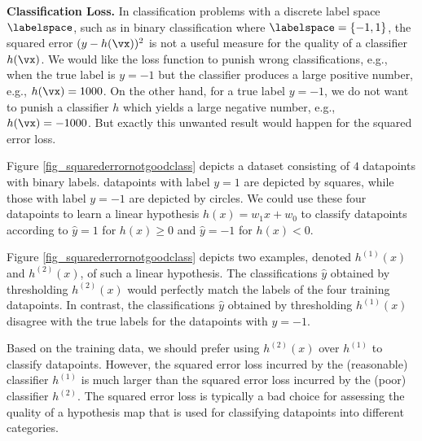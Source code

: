 \documentclass[12pt]{report}
\begin{document}
{\bf Classification Loss.} In classification problems with a 
discrete label space $\labelspace$, such as in binary classification 
where $\labelspace = \{-1,1\}$, the squared error $(y - h(\vx))^2$ 
is not a useful measure for the quality of a classifier $h(\vx)$. 
We would like the loss function to punish wrong classifications, 
e.g., when the true label is $y=-1$ but the classifier produces a 
large positive number, e.g., $h(\vx) = 1000$. On the other hand, 
for a true label $y=-1$, we do not want to punish a classifier $h$ 
which yields a large negative number, e.g., $h(\vx) = -1000$. But 
exactly this unwanted result would happen for the squared error 
loss. 

Figure \ref{fig_squarederrornotgoodclass} depicts a dataset 
consisting of $4$ datapoints with binary labels. datapoints 
with label $y=1$ are depicted by squares, while those with label 
$y=-1$ are depicted by circles. We could use these four datapoints 
to learn a linear hypothesis $h(x) = w_{1} x + w_{0}$ to classify 
datapoints according to $\hat{y} = 1$ for $h(x) \geq 0$ and 
$\hat{y}=-1$ for $h(x) < 0$. 

Figure \ref{fig_squarederrornotgoodclass} depicts two examples, 
denoted $h^{(1)}(x)$ and $h^{(2)}(x)$, of such a linear hypothesis. 
The classifications $\hat{y}$ obtained by thresholding $h^{(2)}(x)$ would 
perfectly match the labels of the four training datapoints. In 
contrast, the classifications $\hat{y}$ obtained by thresholding 
$h^{(1)}(x)$ disagree with the true labels for the datapoints 
with $y=-1$. 

Based on the training data, we should prefer using $h^{(2)}(x)$ 
over $h^{(1)}$ to classify datapoints. However, the squared error 
loss incurred by the (reasonable) classifier $h^{(1)}$ is much larger 
than the squared error loss incurred by the (poor) classifier $h^{(2)}$. 
The squared error loss is typically a bad choice for assessing 
the quality of a hypothesis map that is used for classifying datapoints 
into different categories. 
\end{document}
